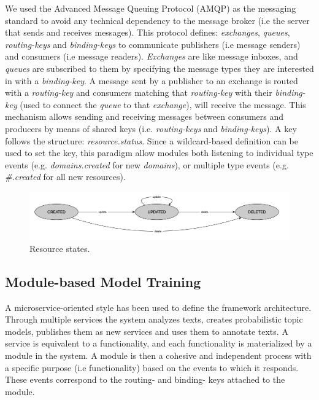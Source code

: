 We used the Advanced Message Queuing Protocol (AMQP) as the messaging standard to avoid any technical dependency to the message broker (i.e the server that sends and receives messages). This protocol defines: \textit{exchanges}, \textit{queues}, \textit{routing-keys} and \textit{binding-keys} to communicate publishers (i.e message senders) and consumers (i.e message readers). \textit{Exchanges} are like message inboxes, and \textit{queues} are subscribed to them by specifying the message types they are interested in with a \textit{binding-key}. A message sent by a publisher to an exchange is routed with a \textit{routing-key} and consumers matching that \textit{routing-key} with their \textit{binding-key} (used to connect the \textit{queue} to that \textit{exchange}), will receive the message. This mechanism allows sending and receiving messages between consumers and producers by means of shared keys (i.e. \textit{routing-keys} and \textit{binding-keys}). A key follows the structure: \textit{resource.status}. Since a wildcard-based definition can be used to set the key, this paradigm allow modules both listening to individual type events (e.g. \textit{domains.created} for new \textit{domains}), or multiple type events (e.g. \textit{\#.created} for all new resources).


\begin{figure}
  \center
  \includegraphics[scale=0.3]{resource-states}
  \caption{Resource states.}
  \label{fig:librairy-states}
\end{figure}


\subsection{Module-based Model Training}

A microservice-oriented style has been used to define the framework architecture. Through multiple services the system analyzes texts, creates probabilistic topic models, publishes them as new services and uses them to annotate texts. A service is equivalent to a functionality, and each functionality is materialized by a module in the system. A module is then a cohesive and independent process \cite{Dragoni2016} with a specific purpose (i.e functionality) based on the events to which it responds. These events correspond to the routing- and binding- keys attached to the module.

